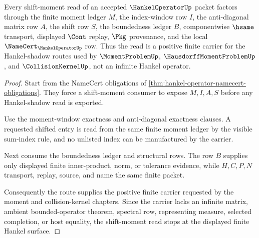 \begin{theorem}
\label{thm:hankel-operator-shift-moment-route}
Every shift-moment read of an accepted $\HankelOperatorUp$ packet factors through the finite moment ledger $M$, the index-window row $I$, the anti-diagonal matrix row $A$, the shift row $S$, the boundedness ledger $B$, componentwise $\hsame$ transport, displayed $\Cont$ replay, $\Pkg$ provenance, and the local $\NameCert_{\HankelOperatorUp}$ row. Thus the read is a positive finite carrier for the Hankel-shadow routes used by $\MomentProblemUp$, $\HausdorffMomentProblemUp$, and $\CollisionKernelUp$, not an infinite Hankel operator.
\end{theorem}
\begin{proof}
Start from the NameCert obligations of \autoref{thm:hankel-operator-namecert-obligations}. They force a shift-moment consumer to expose $M,I,A,S$ before any Hankel-shadow read is exported.

Use the moment-window exactness and anti-diagonal exactness clauses. A requested shifted entry is read from the same finite moment ledger by the visible sum-index rule, and no unlisted index can be manufactured by the carrier.

Next consume the boundedness ledger and structural rows. The row $B$ supplies only displayed finite inner-product, norm, or tolerance evidence, while $H,C,P,N$ transport, replay, source, and name the same finite packet.

Consequently the route supplies the positive finite carrier requested by the moment and collision-kernel chapters. Since the carrier lacks an infinite matrix, ambient bounded-operator theorem, spectral row, representing measure, selected completion, or host equality, the shift-moment read stops at the displayed finite Hankel surface.
\end{proof}



